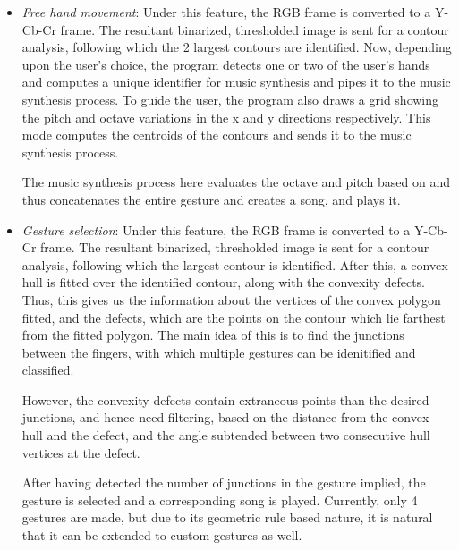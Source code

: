 \documentclass[letterpaper, 11 pt, twoside, conference]{ieeeconf}
\begin{document}
  \begin{itemize}
    \item \textit{Free hand movement}: Under this feature, the RGB frame is converted to a Y-Cb-Cr frame. The
      resultant binarized, thresholded image is sent for a contour analysis, following which the 2 largest
      contours are identified. Now, depending upon the user's choice, the program detects one or two of the user's
      hands and computes a unique identifier for music synthesis and pipes it to the music synthesis process. To guide
      the user, the program also draws a grid showing the pitch and octave variations in the x and y directions
      respectively. This mode computes the centroids of the contours and sends it to the music synthesis process.

      The music synthesis process here evaluates the octave and pitch based on %
      and thus concatenates the entire gesture and creates a song, and plays it.
      \par\null\par
    \item \textit{Gesture selection}: Under this feature, the RGB frame is converted to a Y-Cb-Cr frame. The
      resultant binarized, thresholded image is sent for a contour analysis, following which the largest contour
      is identified. After this, a convex hull is fitted over the identified contour, along with the convexity defects.
      Thus, this gives us the information about the vertices of the convex polygon fitted, and the defects,
      which are the points on the contour which lie farthest from the fitted polygon. The main idea of this is
      to find the junctions between the fingers, with which multiple gestures can be idenitified and classified.
      
      However, the convexity defects contain extraneous points than the desired junctions, and hence need filtering,
      based on the distance from the convex hull and the defect, and the angle subtended between two consecutive
      hull vertices at the defect.

      After having detected the number of junctions in the gesture implied, the gesture is selected and a corresponding
      song is played. Currently, only 4 gestures are made, but due to its geometric rule based nature, it is natural that
      it can be extended to custom gestures as well.

  \end{itemize}
\end{document}
